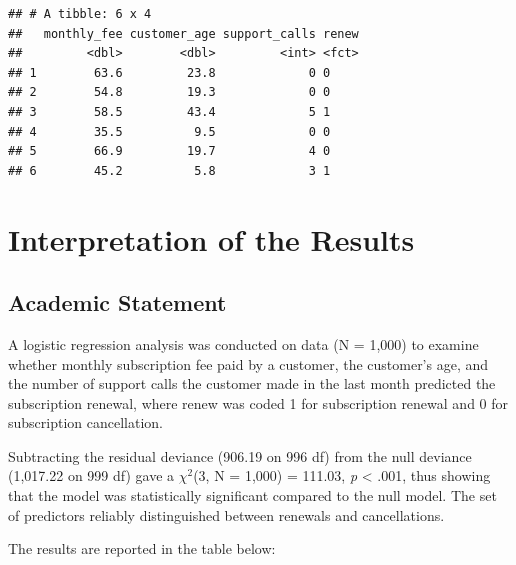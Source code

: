 \documentclass[
]{article}
\begin{document}
\begin{verbatim}
## # A tibble: 6 x 4
##   monthly_fee customer_age support_calls renew
##         <dbl>        <dbl>         <int> <fct>
## 1        63.6         23.8             0 0    
## 2        54.8         19.3             0 0    
## 3        58.5         43.4             5 1    
## 4        35.5          9.5             0 0    
## 5        66.9         19.7             4 0    
## 6        45.2          5.8             3 1
\end{verbatim}

\section{Interpretation of the
Results}\label{interpretation-of-the-results}

\subsection{Academic Statement}\label{academic-statement}

A logistic regression analysis was conducted on data (N = 1,000) to
examine whether monthly subscription fee paid by a customer, the
customer's age, and the number of support calls the customer made in the
last month predicted the subscription renewal, where renew was coded 1
for subscription renewal and 0 for subscription cancellation.

Subtracting the residual deviance (906.19 on 996 df) from the null
deviance (1,017.22 on 999 df) gave a \(\chi^2\)(3, N = 1,000) = 111.03,
\emph{p} \textless{} .001, thus showing that the model was statistically
significant compared to the null model. The set of predictors reliably
distinguished between renewals and cancellations.

The results are reported in the table below:
\end{document}
